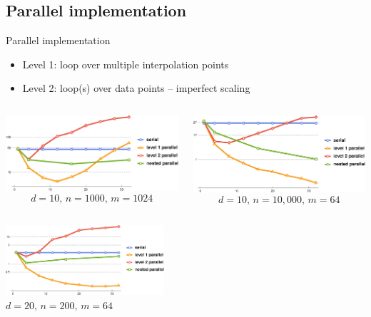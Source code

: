 \documentclass[xcolor=dvipsnames]{beamer}
\begin{document}
\subsection{Parallel implementation}
\begin{frame}{Parallel implementation}
\begin{itemize}
\item Level 1: loop over multiple interpolation points
\item Level 2: loop(s) over data points -- imperfect scaling
\end{itemize}
\medskip
\begin{columns}
\begin{column}{.48\textwidth}
\includegraphics[width=.95\textwidth]{d10n1000m1024.eps}
$$
d=10\text{, }n=1000\text{, }m=1024
$$
\end{column}
\begin{column}{.48\textwidth}
\includegraphics[width=.95\textwidth]{d10n10000m64.eps}
$$
d=10\text{, }n=10,000\text{, }m=64
$$
\end{column}
\end{columns}
\begin{center}
\includegraphics[width=0.44\textwidth]{d20n200m64.eps}\\
$d=20\text{, }n=200\text{, }m=64$
\end{center}
\end{frame}
\end{document}
